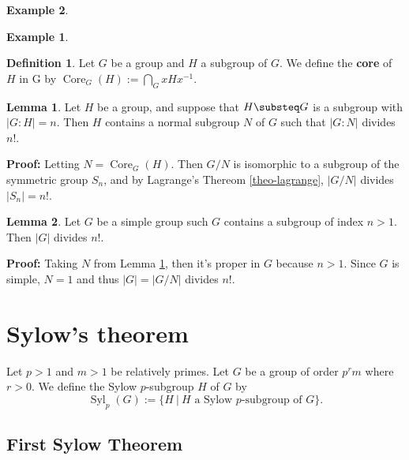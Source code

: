 \documentclass[11pt]{amsbook}%
\theoremstyle{plain}
\theoremstyle{definition}
\newtheorem{definition*}{Definition}
\newtheorem*{example*}{Example}
\newtheorem{lemma}{Lemma}
\numberwithin{equation}{section}
\renewcommand{\proof}{ \textbf{Proof: }}
\DeclareMathOperator{\Syl}{Syl}
\DeclareMathOperator{\Core}{Core}
\DeclareMathOperator{\Syl}{Syl}
\begin{document}
\begin{example*}
\begin{example*}
\begin{definition*}
  Let $G$ be a group and $H$ a subgroup of $G$. We define the \textbf{core}
  of $H$ in G by $\Core_{G}(H) := \bigcap_{G} xHx^{-1}$.
\end{definition*}

\begin{lemma}
  \label{lemm-core}
  Let $H$ be a group, and suppose that $H \substeq G$ is a subgroup with
  $|G:H| = n$. Then $H$ contains a normal subgroup $N$ of $G$ such that
  $|G:N|$ divides $n!$.
\end{lemma} \vspace{1.8em}
\proof Letting $N = \Core_{G}(H)$. Then $G/N$ is isomorphic to a subgroup of the symmetric group $S_{n}$,
and by Lagrange's Thereom \ref{theo-lagrange}, $|G/N|$ divides $|S_{n}| = n!$. \qedsymbol

\begin{lemma}
  Let $G$ be a simple group such $G$ contains a subgroup of index $n > 1$.
  Then $|G|$ divides $n!$.
\end{lemma} \vspace{1.8em}
\proof Taking $N$ from Lemma \ref{lemm-core}, then it's proper in $G$ because $n > 1$.
Since $G$ is simple, $N = 1$ and thus $|G| = |G/N|$ divides $n!$. \qedsymbol

\section{Sylow's theorem}
\label{section-sylow-theorem}
Let $p > 1$ and $m > 1$ be relatively primes. Let $G$ be a group of order
$p^{r}m$ where $r > 0$. We define the Sylow $p$-subgroup $H$ of $G$ by
$$
\Syl_{p}(G) := \{H \ | \ H \text{ a Sylow $p$-subgroup of } G\}.
$$

\subsection{First Sylow Theorem}


\end{example*}
\end{example*}
\end{document}
